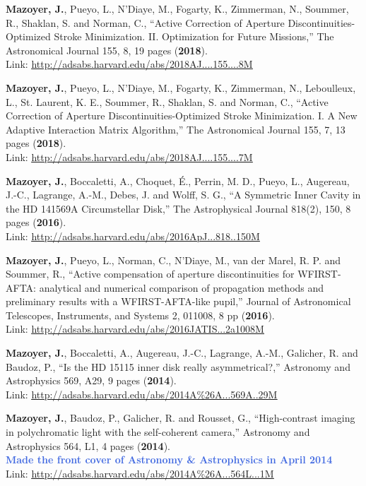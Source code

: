 \documentclass[12pt]{article}
\begin{document}
\begin{etaremune}
\item \textbf{Mazoyer, J.}, Pueyo, L., N’Diaye, M., Fogarty, K., Zimmerman, N., Soummer, R., Shaklan, S. and Norman, C., “Active Correction of Aperture Discontinuities-Optimized Stroke Minimization. II. Optimization for Future Missions,” The Astronomical Journal 155, 8, 19 pages (\textbf{2018}).\\
Link: \textcolor{BrickRed}{\underline{\url{http://adsabs.harvard.edu/abs/2018AJ....155....8M}}}
\item \textbf{Mazoyer, J.}, Pueyo, L., N’Diaye, M., Fogarty, K., Zimmerman, N., Leboulleux, L., St. Laurent, K. E., Soummer, R., Shaklan, S. and Norman, C., “Active Correction of Aperture Discontinuities-Optimized Stroke Minimization. I. A New Adaptive Interaction Matrix Algorithm,” The Astronomical Journal 155, 7, 13 pages (\textbf{2018}).\\
Link: \textcolor{BrickRed}{\underline{\url{http://adsabs.harvard.edu/abs/2018AJ....155....7M}}}
\item \textbf{Mazoyer, J.}, Boccaletti, A., Choquet, É., Perrin, M. D., Pueyo, L., Augereau, J.-C., Lagrange, A.-M., Debes, J. and Wolff, S. G., “A Symmetric Inner Cavity in the HD 141569A Circumstellar Disk,” The Astrophysical Journal 818(2), 150, 8 pages (\textbf{2016}).\\
Link: \textcolor{BrickRed}{\underline{\url{http://adsabs.harvard.edu/abs/2016ApJ...818..150M}}}
\item \textbf{Mazoyer, J.}, Pueyo, L., Norman, C., N’Diaye, M., van der Marel, R. P. and Soummer, R., “Active compensation of aperture discontinuities for WFIRST-AFTA: analytical and numerical comparison of propagation methods and preliminary results with a WFIRST-AFTA-like pupil,” Journal of Astronomical Telescopes, Instruments, and Systems 2, 011008, 8 pp (\textbf{2016}).\\
Link: \textcolor{BrickRed}{\underline{\url{http://adsabs.harvard.edu/abs/2016JATIS...2a1008M}}}
\item \textbf{Mazoyer, J.}, Boccaletti, A., Augereau, J.-C., Lagrange, A.-M., Galicher, R. and Baudoz, P., “Is the HD 15115 inner disk really asymmetrical?,” Astronomy and Astrophysics 569, A29, 9 pages (\textbf{2014}).\\
Link: \textcolor{BrickRed}{\underline{\url{http://adsabs.harvard.edu/abs/2014A\%26A...569A..29M}}}
\item \textbf{Mazoyer, J.}, Baudoz, P., Galicher, R. and Rousset, G., “High-contrast imaging in polychromatic light with the self-coherent camera,” Astronomy and Astrophysics 564, L1, 4 pages (\textbf{2014}). \\ \textcolor{RoyalBlue}{\textbf{Made the front cover of Astronomy \& Astrophysics in April 2014}}\\
Link: \textcolor{BrickRed}{\underline{\url{http://adsabs.harvard.edu/abs/2014A\%26A...564L...1M}}}


\end{etaremune}
\end{document}
